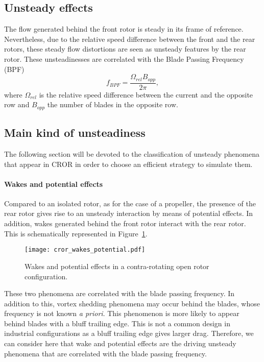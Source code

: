 
\subsection{Unsteady effects}
\label{sub:cror_from_steady_to_unsteady_phenomena}

The flow generated behind the front rotor
is steady in its frame of reference. Nevertheless,
due to the relative speed difference between the
front and the rear rotors, these steady flow distortions are
seen as unsteady features by the rear rotor. 
These unsteadinesses are correlated with the Blade Passing Frequency (BPF)
\begin{equation}
	f_{BPF} = \frac{\Omega_{rel} B_{opp}}{2 \pi},
\end{equation}
where $\Omega_{rel}$ is the relative speed difference between
the current and the opposite row
and $B_{opp}$ the number of blades in the opposite row.

\subsection{Main kind of unsteadiness}
\label{sub:cror_main_unsteadinesses}

The following section will be devoted to the classification
of unsteady phenomena that appear in CROR in 
order to choose an efficient strategy to simulate them.

\paragraph{Wakes and potential effects}

Compared to an isolated rotor, as for the case of a propeller,
the presence of the rear rotor gives rise to an unsteady
interaction by means of potential effects. In addition, wakes generated
behind the front rotor interact with the rear rotor.
This is schematically represented in Figure~\ref{fig:cror_wakes_potential}.
\begin{figure}[htp]
  \centering
  \texttt{[image: cror\_wakes\_potential.pdf]}
  \caption{Wakes and potential effects in a 
  contra-rotating open rotor configuration.}
  \label{fig:cror_wakes_potential}
\end{figure}
These two phenomena are correlated with the blade passing frequency.
In addition to this, vortex shedding phenomena may occur behind the blades, 
whose frequency is not known \emph{a priori}.
This phenomenon is more likely to appear behind blades with a bluff trailing edge.
This is not a common design in industrial configurations as a bluff trailing edge
gives larger drag. Therefore, we can consider here that 
wake and potential effects are the driving unsteady phenomena
that are correlated with the blade passing frequency.

